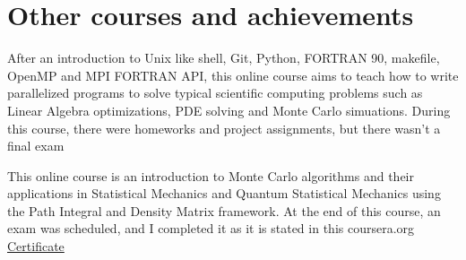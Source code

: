 \documentclass[11pt,a4paper]{moderncv}
\begin{document}
\section{Other courses and achievements}
{\small After an introduction to Unix like shell, Git, Python, FORTRAN 90, makefile, OpenMP and MPI FORTRAN API, this online course aims to teach how to write parallelized programs to solve typical scientific computing problems such as Linear Algebra optimizations, PDE solving and Monte Carlo simuations. During this course, there were homeworks and project assignments, but there wasn't a final exam}

{\small This online course is an introduction to Monte Carlo algorithms and their applications in Statistical Mechanics and Quantum Statistical Mechanics using the Path Integral and Density Matrix framework. At the end of this course, an exam was scheduled, and I completed it as it is stated in this coursera.org \textcolor{blue}{\href{http://dgiannelli.github.io/coursera_smac.pdf}{Certificate}}}

\end{document}
